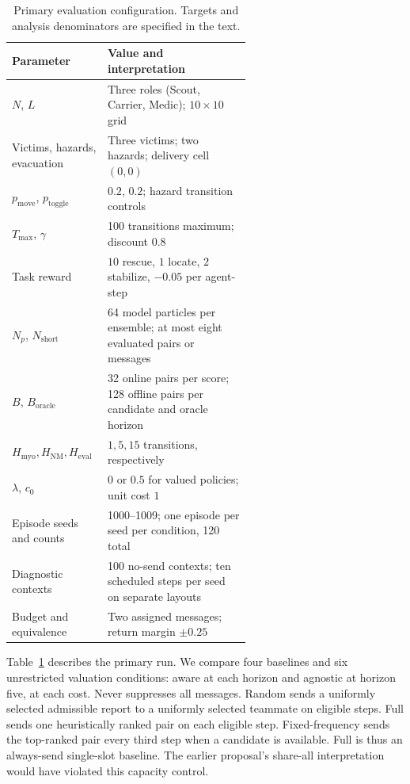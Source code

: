 \documentclass{article}
\begin{document}
\begin{table}[t]
\caption{Primary evaluation configuration. Targets and analysis denominators are specified in the text.}
\label{tab:config}
\centering
\begin{tabular}{@{}lp{0.60\linewidth}@{}}
\toprule
Parameter & Value and interpretation\\
\midrule
$N$, $L$ & Three roles (Scout, Carrier, Medic); $10\times 10$ grid\\
Victims, hazards, evacuation & Three victims; two hazards; delivery cell $(0,0)$\\
$p_{\mathrm{move}}$, $p_{\mathrm{toggle}}$ & $0.2$, $0.2$; hazard transition controls\\
$T_{\max}$, $\gamma$ & 100 transitions maximum; discount $0.8$\\
Task reward & $10$ rescue, $1$ locate, $2$ stabilize, $-0.05$ per agent-step\\
$N_p$, $N_{\mathrm{short}}$ & 64 model particles per ensemble; at most eight evaluated pairs or messages\\
$B$, $B_{\mathrm{oracle}}$ & 32 online pairs per score; 128 offline pairs per candidate and oracle horizon\\
$H_{\mathrm{myo}},H_{\mathrm{NM}},H_{\mathrm{eval}}$ & $1,5,15$ transitions, respectively\\
$\lambda$, $c_0$ & $0$ or $0.5$ for valued policies; unit cost $1$\\
Episode seeds and counts & 1000--1009; one episode per seed per condition, 120 total\\
Diagnostic contexts & 100 no-send contexts; ten scheduled steps per seed on separate layouts\\
Budget and equivalence & Two assigned messages; return margin $\pm 0.25$\\
\bottomrule
\end{tabular}
\end{table}

Table~\ref{tab:config} describes the primary run. We compare four baselines and six unrestricted valuation conditions: aware at each horizon and agnostic at horizon five, at each cost. Never suppresses all messages. Random sends a uniformly selected admissible report to a uniformly selected teammate on eligible steps. Full sends one heuristically ranked pair on each eligible step. Fixed-frequency sends the top-ranked pair every third step when a candidate is available. Full is thus an always-send single-slot baseline. The earlier proposal's share-all interpretation would have violated this capacity control.
\end{document}
